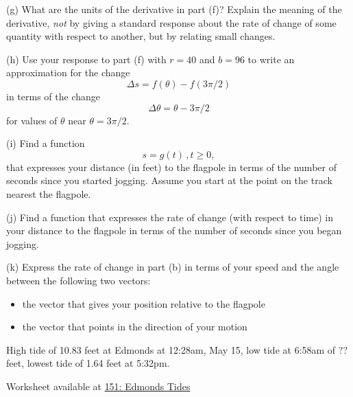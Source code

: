 \documentclass{ximera}
\begin{document}
\begin{exercise}
(g) What are the units of the derivative in part (f)? Explain the meaning of the derivative, \emph{not} by giving a standard response about the rate of change of some quantity with respect to another, but by relating small changes.

(h) Use your response to part (f) with $r=40$ and $b=96$ to write an approximation for the change
\[
         \Delta s = f(\theta) - f(3\pi/2)
\]
in terms of the change 
\[
     \Delta \theta = \theta - 3\pi/2
\]
for values of $\theta$ near $\theta=3\pi/2$. 


(i) Find a function 
\[
   s = g(t) \, , t\geq 0,
\]
that expresses your distance (in feet) to the flagpole in terms of the number of seconds since you started jogging. Assume you start at the point on the track nearest the flagpole.

(j) Find a function that expresses the rate of change (with respect to time) in your distance to the flagpole in terms of the number of seconds since you began jogging.

(k) Express the rate of change in part (b) in terms of your speed and the angle between the following two vectors:

\begin{itemize}
\item{the vector that gives your position relative to the flagpole}

\item{the vector that points in the direction of your motion}
\end{itemize}
\end{exercise}


\begin{exercise} \label{Ex:4rett4t4}
High tide of 10.83 feet at Edmonds at 12:28am, May 15, low tide at 6:58am of ?? feet, lowest tide of 1.64 feet at 5:32pm.

\begin{onlineOnly}
    \begin{center}
\end{center}
\end{onlineOnly}

Worksheet available at \href{https://www.desmos.com/calculator/zta9tkzzmx}{151: Edmonds Tides}
\end{exercise}
\end{document}
